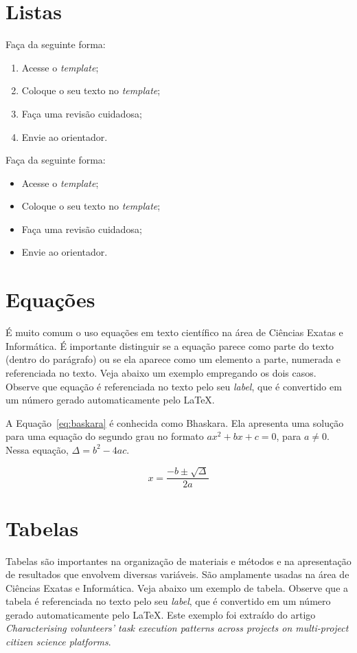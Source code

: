 \documentclass[12pt]{article}
\begin{document}
\section{Listas}

Faça da seguinte forma:
\begin{enumerate}
    \item Acesse o \textit{template};
    \item Coloque o seu texto no \textit{template};
    \item Faça uma revisão cuidadosa;
    \item Envie ao orientador.
\end{enumerate}


Faça da seguinte forma:
\begin{itemize}
    \item Acesse o \textit{template};
    \item Coloque o seu texto no \textit{template};
    \item Faça uma revisão cuidadosa;
    \item Envie ao orientador.
\end{itemize}

\section{Equações}

É muito comum o uso equações em texto científico na área de Ciências Exatas e Informática. É importante distinguir se a equação parece como parte do texto (dentro do parágrafo) ou se ela aparece como um elemento a parte, numerada e referenciada no texto. Veja abaixo um exemplo empregando os dois casos. Observe que equação é referenciada no texto pelo seu \textit{label}, que é convertido em um número gerado automaticamente pelo \LaTeX.

A Equação~\ref{eq:baskara} é conhecida como Bhaskara. Ela apresenta uma solução para uma equação do segundo grau no formato $ax^2+bx+c=0$, para $a\neq 0$. Nessa equação, $\Delta = b^2-4ac$.

\begin{equation}
\label{eq:baskara}
  x=\frac{-b\pm\sqrt{\Delta}}{2a}
\end{equation} 


\section{Tabelas}

Tabelas são importantes na organização de materiais e métodos e na apresentação de resultados que envolvem diversas variáveis. São amplamente usadas na área de Ciências Exatas e Informática. Veja abaixo um exemplo de tabela. Observe que a tabela é referenciada no texto pelo seu \textit{label}, que é convertido em um número gerado automaticamente pelo \LaTeX. Este exemplo foi extraído do artigo \textit{Characterising volunteers' task execution patterns across projects on multi-project citizen science platforms}\cite{Ponciano:IHC:2019}.
\end{document}
